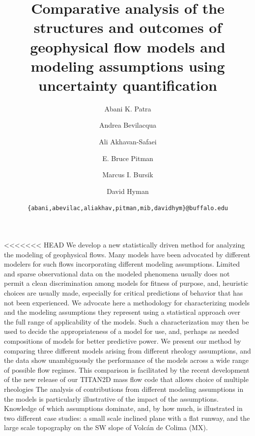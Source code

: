 \documentclass{article}
\begin{document}
\title{\bf Comparative analysis of the structures and outcomes of geophysical flow models and modeling assumptions using uncertainty quantification}
\author[1,3]{Abani K. Patra}
\author[2]{Andrea Bevilacqua}
\author[1]{Ali Akhavan-Safaei}
\author[4]{E. Bruce Pitman}
\author[2]{Marcus I. Bursik}
\author[2]{David Hyman}


\date{\texttt{\{abani,abevilac,aliakhav,pitman,mib,davidhym\}@buffalo.edu}}


\maketitle

\abstract
<<<<<<< HEAD
We develop a new statistically driven method for analyzing the modeling of geophysical flows. Many models have been advocated by different modelers for such flows incorporating different modeling assumptions. Limited and sparse observational data on the modeled phenomena usually does not permit a clean discrimination among models for fitness of purpose, and, heuristic choices are usually made, especially for critical predictions of behavior that has not been experienced. We advocate here a methodology for characterizing models and the modeling assumptions they represent using a statistical approach over the full range of applicability of the models. Such a characterization may then be used to decide the appropriateness of a model for use, and, perhaps as needed  compositions of models for better predictive power. We present our method by comparing three different models arising from different rheology assumptions, and the data show unambiguously the performance of the models across a wide range of possible flow regimes. This comparison is facilitated by the recent development of the new release of our TITAN2D mass flow code that allows choice of multiple rheologies The analysis of contributions from different modeling  assumptions in the models is particularly illustrative of the impact of the assumptions. Knowledge of which assumptions dominate, and, by how much, is illustrated in two different case studies: a small scale inclined plane with a flat runway, and the large scale topography on the SW slope of Volc\'{a}n de Colima (MX).
\end{document}
